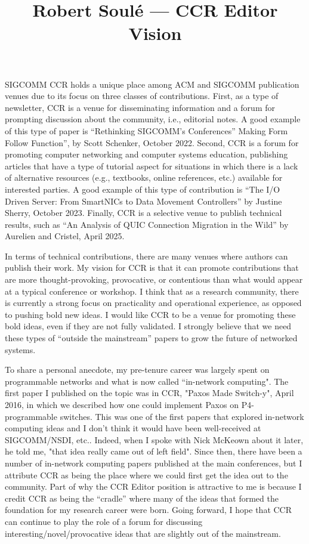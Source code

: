 \documentclass[11pt]{article}
\title{ Robert Soul\'{e} --- CCR Editor Vision}
\author{  }
\date{ }
\begin{document}
\maketitle	
\thispagestyle{empty}


SIGCOMM CCR holds a unique place among ACM and SIGCOMM publication venues due to its focus on three classes of contributions. First, as a type of newsletter, CCR is a venue for disseminating information and a forum for prompting discussion about the community, i.e., editorial notes. A good example of this type of paper is “Rethinking SIGCOMM’s Conferences” Making Form Follow Function”, by Scott Schenker, October 2022. Second, CCR is a forum for promoting computer networking and computer systems education, publishing articles that have a type of tutorial aspect for situations in which there is a lack of alternative resources (e.g., textbooks, online references, etc.) available for interested parties. A good example of this type of contribution is “The I/O Driven Server: From SmartNICs to Data Movement Controllers” by Justine Sherry, October 2023. Finally, CCR is a selective venue to publish technical results, such as “An Analysis of QUIC Connection Migration in the Wild” by Aurelien and Cristel, April 2025.

In terms of technical contributions, there are many venues where authors can publish their work. My vision for CCR is that it can promote contributions that are more thought-provoking, provocative, or contentious than what would appear at a typical conference or workshop. I think that as a research community, there is currently a strong focus on practicality and operational experience, as opposed to pushing bold new ideas. I would like CCR to be a venue for promoting these bold ideas, even if they are not fully validated. I strongly believe that we need these types of “outside the mainstream” papers to grow the future of networked systems. 

To share a personal anecdote, my pre-tenure career was largely spent on programmable networks and what is now called ``in-network computing". The first paper I published on the topic was in CCR, "Paxos Made Switch-y", April 2016, in which we described how one could implement Paxos on P4-programmable switches. This was one of the first papers that explored in-network computing ideas and I don't think it would have been well-received at SIGCOMM/NSDI, etc.. Indeed, when I spoke with Nick McKeown about it later, he told me, "that idea really came out of left field". Since then, there have been a number of in-network computing papers published at the main conferences, but I attribute CCR as being the place where we could first get the idea out to the community. Part of why the CCR Editor position is attractive to me is because I credit CCR as being the “cradle” where many of the ideas that formed the foundation for my research career were born. Going forward, I hope that CCR can continue to play the role of a forum for discussing interesting/novel/provocative ideas that are slightly out of the mainstream. 
\end{document}
